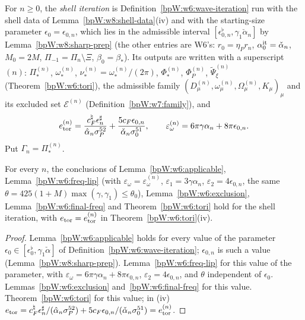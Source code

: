 \begin{definition}\label{bpW:w8:shell-iter}
For $n\ge0$, the \emph{shell iteration} is Definition~\ref{bpW:w6:wave-iteration} run with the shell data of
Lemma~\ref{bpW:w8:shell-data}(iv) and with the starting-size parameter $\epsilon_0=\epsilon_{0,n}$, which lies in the
admissible interval $[\epsilon^\flat_{0,n},\gamma_1\check\alpha_n]$ by Lemma~\ref{bpW:w8:sharp-prep} (the other entries are W6's: $r_0=\eta_Pr_n$, $\alpha_0^{\rm it}=\check\alpha_n$, $M_0=2M$, $\Pi_{-1}=\Pi_n\setminus\Xi$, $\beta_0=\beta_*$).
Its outputs are written with a superscript $(n)$: $\Pi^{(n)}_*$, $\omega^{(n)}_*$, $\nu^{(n)}_*=\omega^{(n)}_*/(2\pi)$, $\Phi^{(n)}_*$,
$\Phi^{(n)}_P$, $\tilde\Psi^{(n)}_\xi$ (Theorem~\ref{bpW:w6:tori}), the admissible family
$(D^{(n)}_\mu,\omega^{(n)}_\mu,\Omega^{(n)}_\mu,K_\mu)_\mu$ and its excluded set $\mathcal E^{(n)}$ (Definition~\ref{bpW:w7:family}),
and
\[e^{(n)}_{\rm tor}=\frac{c^\natural_F\epsilon^\sharp_n}{\hat\alpha_n\sigma_P^{52}}+\frac{5c_F\epsilon_{0,n}}{\check\alpha_n\sigma_0^{51}},\qquad
\varepsilon^{(n)}_\omega=6\pi\gamma\alpha_n+8\pi\epsilon_{0,n}.\]
Put $\Gamma_n=\Pi^{(n)}_*$.
\end{definition}

\begin{lemma}\label{bpW:w8:w6-general}
For every $n$, the conclusions of Lemma~\ref{bpW:w6:applicable}, Lemma~\ref{bpW:w6:freq-lip} (with
$\varepsilon_\omega=\varepsilon^{(n)}_\omega$, $\varepsilon_1=3\gamma\alpha_n$, $\varepsilon_2=4\epsilon_{0,n}$, the same
$\theta=425(1+M)\max(\gamma,\gamma_1)\le\theta_0$), Lemma~\ref{bpW:w6:exclusion}, Lemma~\ref{bpW:w6:final-freq} and
Theorem~\ref{bpW:w6:tori} hold for the shell iteration, with $e_{\rm tor}=e^{(n)}_{\rm tor}$ in Theorem~\ref{bpW:w6:tori}(iv).
\end{lemma}
\begin{proof}
\label{stepW:w8:g-app} Lemma~\ref{bpW:w6:applicable} holds for every value of the parameter
$\epsilon_0\in[\epsilon^\flat_0,\gamma_1\check\alpha]$ of Definition~\ref{bpW:w6:wave-iteration}; $\epsilon_{0,n}$ is such a value
(Lemma~\ref{bpW:w8:sharp-prep}).
\label{stepW:w8:g-freq} Lemma~\ref{bpW:w6:freq-lip} for this value of the parameter, with
$\varepsilon_\omega=6\pi\gamma\alpha_n+8\pi\epsilon_{0,n}$, $\varepsilon_2=4\epsilon_{0,n}$, and $\theta$ independent of $\epsilon_0$.
\label{stepW:w8:g-excl} Lemmas~\ref{bpW:w6:exclusion} and~\ref{bpW:w6:final-freq} for this value.
\label{stepW:w8:g-tori} Theorem~\ref{bpW:w6:tori} for this value; in (iv)
$e_{\rm tor}=c^\natural_F\epsilon^\sharp_n/(\hat\alpha_n\sigma_P^{52})+5c_F\epsilon_{0,n}/(\check\alpha_n\sigma_0^{51})=e^{(n)}_{\rm tor}$.
\end{proof}

